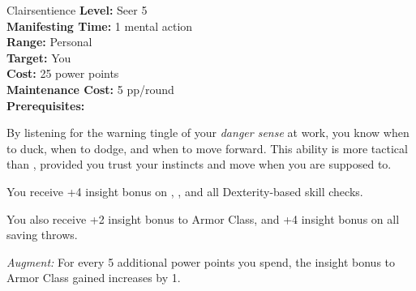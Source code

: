 {Clairsentience}
{
	\textbf{Level:}
	Seer 5\\
	\textbf{Manifesting Time:}
	1 mental action\\
	\textbf{Range:}
	Personal\\
	\textbf{Target:}
	You\\
	\textbf{Cost:}
	25 power points\\
	\textbf{Maintenance Cost:}
	5 pp/round\\
	\textbf{Prerequisites:}
	\\
}
{
	By listening for the warning tingle of your \emph{danger sense} at work, you know when to duck, when to dodge, and when to move forward. This ability is more tactical than , provided you trust your instincts and move when you are supposed to.

	You receive +4 insight bonus on , , and all Dexterity-based skill checks.

	You also receive +2 insight bonus to Armor Class, and +4 insight bonus on all saving throws.

	\textit{Augment:} For every 5 additional power points you spend, the insight bonus to Armor Class gained increases by 1.
}